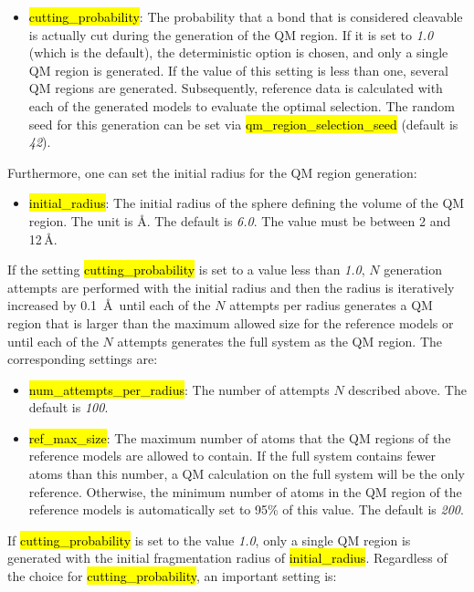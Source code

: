 \documentclass[]{tufte-book}
\begin{document}
{{\begin{itemize}
\item \hl{cutting\_probability}: The probability that a bond that is considered cleavable is actually cut during the generation of the QM region. If it is set to \textit{1.0} (which is the default), the deterministic option is chosen, and only a single QM region is generated.
If the value of this setting is less than one, several QM regions are generated. Subsequently, reference data is calculated with each of the generated models to evaluate the optimal selection. The random seed for this generation can be set via \hl{qm\_region\_selection\_seed} (default is \textit{42}).
\end{itemize}

Furthermore, one can set the initial radius for the QM region generation:

\begin{itemize}
\item \hl{initial\_radius}:  The initial radius of the sphere defining the volume of the QM region. The unit is \AA. The default is \textit{6.0}. The value must be between 2 and 12\,\AA.
\end{itemize}

If the setting \hl{cutting\_probability} is set to a value less than \textit{1.0}, $N$ generation attempts are performed with the initial radius and then the radius is iteratively increased by 0.1~\AA~until each of the $N$ attempts per radius generates a QM region that is larger than the maximum allowed size for the reference models or until each of the $N$ attempts generates the full system as the QM region. The corresponding settings are:
\begin{itemize}
\item \hl{num\_attempts\_per\_radius}: The number of attempts $N$ described above. The default is \textit{100}.
\item \hl{ref\_max\_size}: The maximum number of atoms that the QM regions of the reference models are allowed to contain. If the full system contains fewer atoms than this number, a QM calculation on the full system will be the only reference. Otherwise, the minimum number of atoms in the QM region of the reference models is automatically set to 95\% of this value. The default is \textit{200}.
\end{itemize}

If \hl{cutting\_probability} is set to the value \textit{1.0}, only a single QM region is generated with the initial fragmentation radius of \hl{initial\_radius}. Regardless of the choice for \hl{cutting\_probability}, an important setting is:

}}
\end{document}
